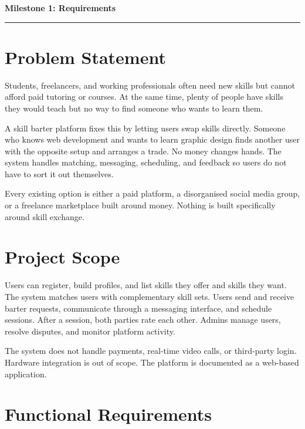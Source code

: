 \documentclass[12pt,a4paper]{article}
\begin{document}
\tableofcontents
\newpage

\begin{center}
{\LARGE \textbf{Milestone 1: Requirements}}\\[0.1cm]
\rule{\linewidth}{0.6mm}
\end{center}
\vspace{4pt}

\section{Problem Statement}
\vspace{4pt}

Students, freelancers, and working professionals often need new skills but cannot afford paid tutoring or courses. At the same time, plenty of people have skills they would teach but no way to find someone who wants to learn them.

A skill barter platform fixes this by letting users swap skills directly. Someone who knows web development and wants to learn graphic design finds another user with the opposite setup and arranges a trade. No money changes hands. The system handles matching, messaging, scheduling, and feedback so users do not have to sort it out themselves.

Every existing option is either a paid platform, a disorganised social media group, or a freelance marketplace built around money. Nothing is built specifically around skill exchange.

\section{Project Scope}
\vspace{4pt}

Users can register, build profiles, and list skills they offer and skills they want. The system matches users with complementary skill sets. Users send and receive barter requests, communicate through a messaging interface, and schedule sessions. After a session, both parties rate each other. Admins manage users, resolve disputes, and monitor platform activity.

The system does not handle payments, real-time video calls, or third-party login. Hardware integration is out of scope. The platform is documented as a web-based application.

\section{Functional Requirements}
\vspace{4pt}
\end{document}
